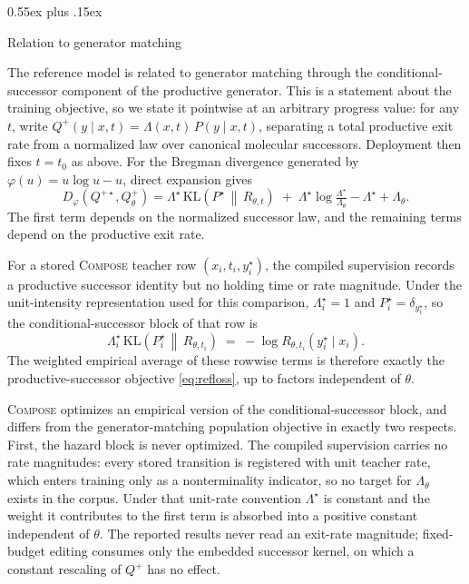\documentclass{article}
\makeatletter
\theoremstyle{definition}
\theoremstyle{remark}
\newcommand{\KL}{\mathrm{KL}}
\newcommand{\method}{\textsc{Compose}\xspace}
\def\subsection{\@startsection{subsection}{2}{\z@}{-1.2ex plus -0.4ex minus -.2ex}%
  {0.55ex plus .15ex}{\normalsize\sc\raggedright}}
\makeatother
\begin{document}
\subsection{Relation to generator matching}
\label{app:gm}

The reference model is related to generator matching through the
conditional-successor component of the productive generator. This is a statement
about the training objective, so we state it pointwise at an arbitrary progress
value: for any $t$, write $Q^{+}(y\mid x,t)=\Lambda(x,t)\,P(y\mid x,t)$,
separating a total productive exit rate from a normalized law over canonical
molecular successors. Deployment then fixes $t=t_0$ as above. For the Bregman divergence generated by $\varphi(u)=u\log u-u$,
direct expansion gives
\begin{equation}
D_\varphi\!\left(Q^{+\star},Q^{+}_\theta\right)
=\Lambda^{\star}\,\KL\!\left(P^{\star}\,\middle\|\,R_{\theta,t}\right)
\;+\;\Lambda^{\star}\log\tfrac{\Lambda^{\star}}{\Lambda_\theta}
-\Lambda^{\star}+\Lambda_\theta .
\label{eq:gmsplit}
\end{equation}
The first term depends on the normalized successor law, and the remaining terms
depend on the productive exit rate.

For a stored \method{} teacher row $(x_i,t_i,y_i^{\star})$, the compiled supervision records a productive successor identity but no holding time or rate magnitude. Under the unit-intensity representation used for this comparison, $\Lambda^{\star}_i=1$ and $P^{\star}_i=\delta_{y^{\star}_i}$, so the conditional-successor block of that row is
\[
\Lambda^{\star}_i\,\KL\!\left(P^{\star}_i\,\middle\|\,R_{\theta,t_i}\right)
\;=\;-\log R_{\theta,t_i}\!\left(y^{\star}_i\mid x_i\right).
\]
The weighted empirical average of these rowwise terms is therefore exactly the productive-successor objective \eqref{eq:refloss}, up to factors independent of $\theta$.

\method{} optimizes an empirical version of the conditional-successor block, and differs from the generator-matching population objective in exactly two respects. First, the hazard block is never optimized. The compiled supervision carries no rate magnitudes: every stored transition is registered with unit teacher rate, which enters training only as a nonterminality indicator, so no target for $\Lambda_\theta$ exists in the corpus. Under that unit-rate convention $\Lambda^{\star}$ is constant and the weight it contributes to the first term is absorbed into a positive constant independent of $\theta$. The reported results never read an exit-rate magnitude; fixed-budget editing consumes only the embedded successor kernel, on which a constant rescaling of $Q^{+}$ has no effect.
\end{document}
